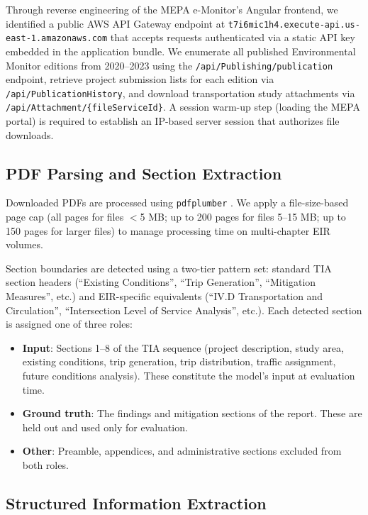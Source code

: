 \documentclass[preprint,12pt]{elsarticle}
\begin{document}
Through reverse engineering of the MEPA e-Monitor's Angular frontend, we
identified a public AWS API Gateway endpoint at
\texttt{t7i6mic1h4.execute-api.us-east-1.amazonaws.com}
that accepts requests authenticated via a static API key embedded in the
application bundle.
We enumerate all published Environmental Monitor editions from 2020--2023
using the \texttt{/api/Publishing/publication} endpoint,
retrieve project submission lists for each edition via
\texttt{/api/PublicationHistory}, and download transportation study attachments
via \texttt{/api/Attachment/\{fileServiceId\}}.
A session warm-up step (loading the MEPA portal) is required to establish an
IP-based server session that authorizes file downloads.

\subsection{PDF Parsing and Section Extraction}

Downloaded PDFs are processed using \texttt{pdfplumber} \citep{pdfplumber}.
We apply a file-size-based page cap (all pages for files $<$5 MB; up to 200
pages for files 5--15 MB; up to 150 pages for larger files) to manage
processing time on multi-chapter EIR volumes.

Section boundaries are detected using a two-tier pattern set: standard TIA
section headers (``Existing Conditions'', ``Trip Generation'',
``Mitigation Measures'', etc.) and EIR-specific equivalents
(``IV.D Transportation and Circulation'',
``Intersection Level of Service Analysis'', etc.).
Each detected section is assigned one of three roles:

\begin{itemize}
\item \textbf{Input}: Sections 1--8 of the TIA sequence (project description,
study area, existing conditions, trip generation, trip distribution,
traffic assignment, future conditions analysis). These constitute the
model's input at evaluation time.
\item \textbf{Ground truth}: The findings and mitigation sections of the
report. These are held out and used only for evaluation.
\item \textbf{Other}: Preamble, appendices, and administrative sections
excluded from both roles.
\end{itemize}

\subsection{Structured Information Extraction}
\end{document}
